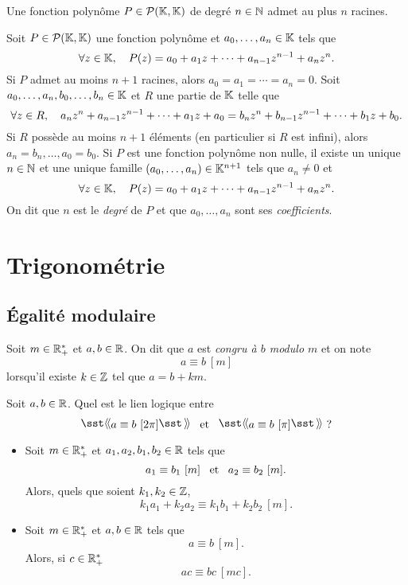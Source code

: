 \documentclass{magnoliaold}
\begin{document}
  \begin{proposition}
  Une fonction polynôme $P\in\mathcal{P}(\mathbb{K},\mathbb{K})$ de degré $n\in\mathbb{N}$ admet au plus $n$ racines.
  \end{proposition}
  
  \begin{remarques}
  \remarque Soit $P\in\mathcal{P}(\mathbb{K},\mathbb{K})$ une fonction polynôme et
   $a_0,\ldots,a_n\in\mathbb{K}$ tels que
    \[\forall z\in\mathbb{K},\quad P(z)=a_0+a_1 z+\cdots+a_{n-1}z^{n-1}+a_n z^n.\]
    Si $P$ admet au moins $n+1$ racines, alors $a_0=a_1=\cdots=a_n=0$.
  \remarque Soit $a_0,\ldots,a_n,b_0,\ldots,b_n\in\mathbb{K}$ et $R$ une partie de
   $\mathbb{K}$ telle que
    \[\forall z\in R,\quad 
    a_n z^n+a_{n-1}z^{n-1}+\cdots+a_1 z+a_0=b_n z^n+b_{n-1}z^{n-1}+\cdots+b_1 z+b_0.\]
    Si $R$ possède au moins $n+1$ éléments (en particulier si $R$ est infini), alors $a_n=b_n, \ldots, a_0=b_0$.
\remarque Si $P$ est une fonction polynôme non nulle, il
  existe un unique $n\in\mathbb{N}$ et une unique famille $(a_0,\ldots,a_n)\in\mathbb{K}^{n+1}$
  tels que $a_n\neq 0$ et
  \[\forall z\in\mathbb{K},\quad P(z)=a_0 + a_1 z + \cdots +  a_{n-1} z^{n-1} + a_n z^n.\]
  On dit que $n$ est le \emph{degré} de $P$ et que $a_0,\ldots,a_n$ sont ses
  \emph{coefficients}.
  \end{remarques}

\section{Trigonométrie}

\subsection{Égalité modulaire}

\begin{definition}
Soit $m\in\mathbb{R}_+^*$ et $a,b\in\mathbb{R}$. On dit que $a$ est \emph{congru à $b$ modulo $m$} et on note
\[a\equiv b\ [m]\]
lorsqu'il existe $k\in\mathbb{Z}$ tel que $a=b+km$.
\end{definition}

\begin{exoUnique}
\exo Soit $a,b\in\mathbb{R}$. Quel est le lien logique entre
  \[\text{\og}a\equiv b\ [2\pi]\text{\fg} \et \text{\og}a\equiv b\ [\pi]\text{\fg} \text{ ?}\]
\end{exoUnique}

\begin{proposition}
\begin{itemize}
\item 
Soit $m\in\mathbb{R}_+^*$ et $a_1,a_2,b_1,b_2\in\mathbb{R}$ tels que
  \[a_1\equiv b_1\ [m] \et a_2\equiv b_2\ [m].\]
Alors, quels que soient $k_1,k_2\in\mathbb{Z}$,
  \[k_1 a_1+k_2 a_2\equiv k_1 b_1+k_2 b_2\ [m].\]
\item Soit $m\in\mathbb{R}_+^*$ et $a,b\in\mathbb{R}$ tels que
  \[a\equiv b\ [m].\]
  Alors, si $c\in\mathbb{R}_+^*$
  \[ac\equiv bc\ [m c].\]
\end{itemize}
\end{proposition}
\end{document}

